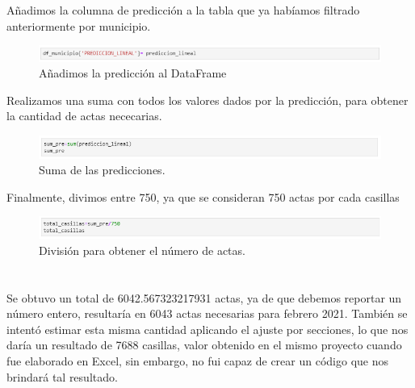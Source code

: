 \documentclass[12pt]{article}
\begin{document}
Añadimos la columna de predicción a la tabla que ya habíamos filtrado anteriormente por municipio.
       \begin{figure}[h] 
       \centering 
    \includegraphics[width=12cm]{Imagen8.png}
        \caption{Añadimos la predicción al DataFrame}
        \label{fig:23}
         \end{figure} 
         
Realizamos una suma con todos los valores dados por la predicción, para obtener la cantidad de actas nececarias.
       \begin{figure}[h!] 
       \centering 
    \includegraphics[width=12cm]{Imagen9.png}
        \caption{Suma de las predicciones.}
        \label{fig:24}
         \end{figure} 
         
Finalmente, divimos entre 750, ya que se consideran 750 actas por cada casillas
       \begin{figure}[h!] 
       \centering 
    \includegraphics[width=12cm]{Imagen10.png}
        \caption{División para obtener el número de actas.}
        \label{fig:25}
         \end{figure} 

\section{}
Se obtuvo un total de 6042.567323217931 actas, ya de que debemos reportar un número entero, resultaría en 6043 actas necesarias para febrero 2021. También se intentó estimar esta misma cantidad aplicando el ajuste por secciones, lo que nos daría un resultado de 7688 casillas, valor obtenido en el mismo proyecto cuando fue elaborado en Excel, sin embargo, no fui capaz de crear un código que nos brindará tal resultado.  
\vspace{2em}
  
\printbibliography

    
\end{document}
